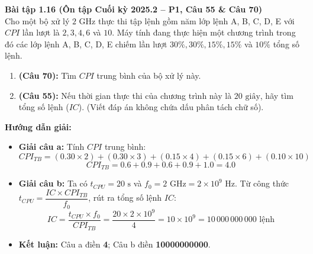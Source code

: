 \textbf{Bài tập 1.16 (Ôn tập Cuối kỳ 2025.2 -- P1, Câu 55 \& Câu 70)}\\
Cho một bộ xử lý $2\text{ GHz}$ thực thi tập lệnh gồm năm lớp lệnh A, B, C, D, E với $CPI$ lần lượt là $2, 3, 4, 6$ và $10$. Máy tính đang thực hiện một chương trình trong đó các lớp lệnh A, B, C, D, E chiếm lần lượt $30\%, 30\%, 15\%, 15\%$ và $10\%$ tổng số lệnh.
\begin{enumerate}[label=\alph*)]
    \item \textbf{(Câu 70):} Tìm $CPI$ trung bình của bộ xử lý này.
    \item \textbf{(Câu 55):} Nếu thời gian thực thi của chương trình này là $20\text{ giây}$, hãy tìm tổng số lệnh ($IC$). (Viết đáp án không chứa dấu phân tách chữ số).
\end{enumerate}
\textbf{Hướng dẫn giải:}
\begin{itemize}
    \item \textbf{Giải câu a:} Tính $CPI$ trung bình:
    $$CPI_{TB} = (0.30 \times 2) + (0.30 \times 3) + (0.15 \times 4) + (0.15 \times 6) + (0.10 \times 10)$$
    $$CPI_{TB} = 0.6 + 0.9 + 0.6 + 0.9 + 1.0 = 4.0$$
    \item \textbf{Giải câu b:} Ta có $t_{CPU} = 20\text{ s}$ và $f_0 = 2\text{ GHz} = 2 \times 10^9\text{ Hz}$. Từ công thức $t_{CPU} = \dfrac{IC \times CPI_{TB}}{f_0}$, rút ra tổng số lệnh $IC$:
    $$IC = \frac{t_{CPU} \times f_0}{CPI_{TB}} = \frac{20 \times 2 \times 10^9}{4} = 10 \times 10^9 = 10\,000\,000\,000\text{ lệnh}$$
    \item \textbf{Kết luận:} Câu a điền \textbf{4}; Câu b điền \textbf{10000000000}.
\end{itemize}

